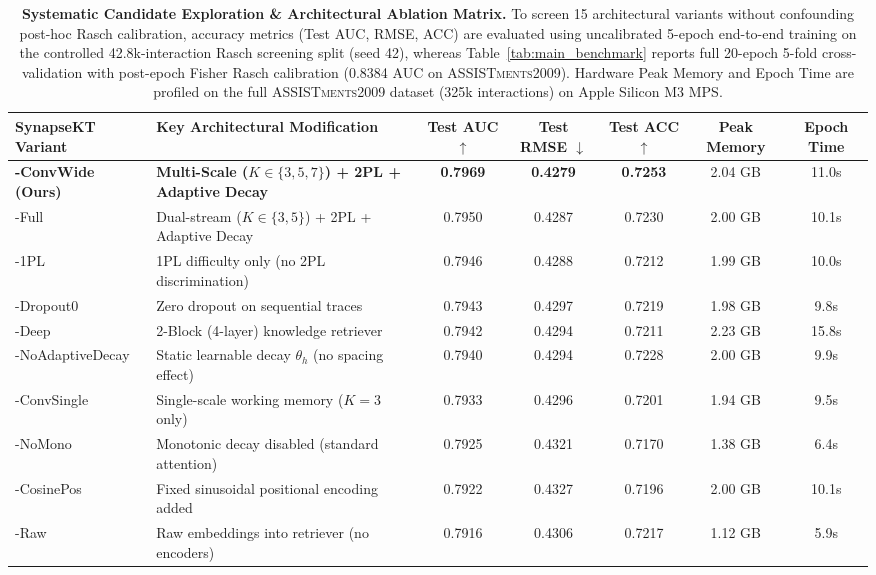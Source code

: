 \documentclass[11pt]{article}
\begin{document}
\begin{table}[t]
\centering
\footnotesize
\setlength{\tabcolsep}{0pt}
\caption{\textbf{Systematic Candidate Exploration \& Architectural Ablation Matrix.} To screen 15 architectural variants without confounding post-hoc Rasch calibration, accuracy metrics (Test AUC, RMSE, ACC) are evaluated using uncalibrated 5-epoch end-to-end training on the controlled 42.8k-interaction Rasch screening split (seed 42), whereas Table~\ref{tab:main_benchmark} reports full 20-epoch 5-fold cross-validation with post-epoch Fisher Rasch calibration (0.8384 AUC on \textsc{ASSISTments2009}). Hardware Peak Memory and Epoch Time are profiled on the full \textsc{ASSISTments2009} dataset (325k interactions) on Apple Silicon M3 MPS.}
\label{tab:ablation}
\begin{tabular*}{\textwidth}{@{\extracolsep{\fill}}lp{4.8cm}ccccc}
\toprule
\textbf{SynapseKT Variant} & \textbf{Key Architectural Modification} & \textbf{Test AUC} $\uparrow$ & \textbf{Test RMSE} $\downarrow$ & \textbf{Test ACC} $\uparrow$ & \textbf{Peak Memory} & \textbf{Epoch Time} \\
\midrule
\textbf{-ConvWide (Ours)} & \textbf{Multi-Scale ($K \in \{3, 5, 7\}$) + 2PL + Adaptive Decay} & \textbf{0.7969} & \textbf{0.4279} & \textbf{0.7253} & 2.04 GB & 11.0s \\
-Full & Dual-stream ($K \in \{3, 5\}$) + 2PL + Adaptive Decay & 0.7950 & 0.4287 & 0.7230 & 2.00 GB & 10.1s \\
-1PL & 1PL difficulty only (no 2PL discrimination) & 0.7946 & 0.4288 & 0.7212 & 1.99 GB & 10.0s \\
-Dropout0 & Zero dropout on sequential traces & 0.7943 & 0.4297 & 0.7219 & 1.98 GB & 9.8s \\
-Deep & 2-Block (4-layer) knowledge retriever & 0.7942 & 0.4294 & 0.7211 & 2.23 GB & 15.8s \\
-NoAdaptiveDecay & Static learnable decay $\theta_h$ (no spacing effect) & 0.7940 & 0.4294 & 0.7228 & 2.00 GB & 9.9s \\
-ConvSingle & Single-scale working memory ($K=3$ only) & 0.7933 & 0.4296 & 0.7201 & 1.94 GB & 9.5s \\
-NoMono & Monotonic decay disabled (standard attention) & 0.7925 & 0.4321 & 0.7170 & 1.38 GB & 6.4s \\
-CosinePos & Fixed sinusoidal positional encoding added & 0.7922 & 0.4327 & 0.7196 & 2.00 GB & 10.1s \\
-Raw & Raw embeddings into retriever (no encoders) & 0.7916 & 0.4306 & 0.7217 & 1.12 GB & 5.9s \\

\end{tabular*}
\end{table}
\end{document}
